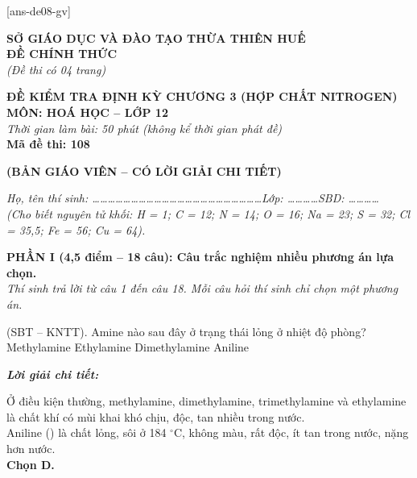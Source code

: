 \documentclass[11pt,a4paper]{article}
\def\loigiai#1{
\par\begingroup\color{blue!80!black}\small
\noindent\textbf{\textit{Lời giải chi tiết:}}\par
#1\par\endgroup}
\begin{document}
[ans-de08-gv]

\noindent
\begin{minipage}[t]{0.48\textwidth}
	\centering
	\textbf{SỞ GIÁO DỤC VÀ ĐÀO TẠO THỪA THIÊN HUẾ}\\
	\textbf{ĐỀ CHÍNH THỨC}\\
	\textit{(Đề thi có 04 trang)}
\end{minipage}\hfill
\begin{minipage}[t]{0.48\textwidth}
	\centering
	\textbf{\color{mainGreen}ĐỀ KIỂM TRA ĐỊNH KỲ CHƯƠNG 3 (HỢP CHẤT NITROGEN)}\\
	\textbf{MÔN: HOÁ HỌC -- LỚP 12}\\
	\textit{Thời gian làm bài: 50 phút (không kể thời gian phát đề)}\\
	\textbf{Mã đề thi: 108}
\end{minipage}


\vspace{0.1cm}
\begin{center}
	\textbf{\color{hfRed}\Large (BẢN GIÁO VIÊN -- CÓ LỜI GIẢI CHI TIẾT)}
\end{center}

\vspace{0.1cm}
\noindent\textit{Họ, tên thí sinh: \dots\dots\dots\dots\dots\dots\dots\dots\dots\dots\dots\dots\dots\dots\dots\dots\dots\dots\dots\dots\dots\dots Lớp: \dots\dots\dots\dots SBD: \dots\dots\dots\dots}\\
\noindent\textit{(Cho biết nguyên tử khối: H = 1; C = 12; N = 14; O = 16; Na = 23; S = 32; Cl = 35,5; Fe = 56; Cu = 64).}

\vspace{0.15cm}
\noindent
\textbf{PHẦN I (4,5 điểm -- 18 câu): Câu trắc nghiệm nhiều phương án lựa chọn.}\\
\textit{Thí sinh trả lời từ câu 1 đến câu 18. Mỗi câu hỏi thí sinh chỉ chọn một phương án.}

\setcounter{ex}{0}

\begin{ex}
(SBT -- KNTT). Amine nào sau đây ở trạng thái lỏng ở nhiệt độ phòng?
\choice
{Methylamine}
{Ethylamine}
{Dimethylamine}
{\True Aniline}
\loigiai{
Ở điều kiện thường, methylamine, dimethylamine, trimethylamine và ethylamine là chất khí có mùi khai khó chịu, độc, tan nhiều trong nước.\\
Aniline (\ce{C6H5NH2}) là chất lỏng, sôi ở 184 $^\circ$C, không màu, rất độc, ít tan trong nước, nặng hơn nước.\\
\textbf{Chọn D.}}
\end{ex}
\end{document}
